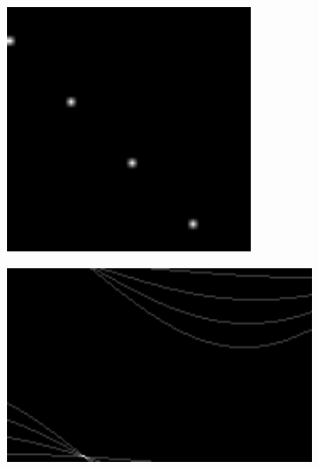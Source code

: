 \documentclass[12pt
,headinclude
,headsepline
,bibtotocnumbered
]{scrartcl}
\begin{document}
\begin{figure}[h]
    \centering
    \begin{subfigure}{0.45\textwidth}
        \includegraphics[width=0.8\textwidth]{plots/test1.png}
    \end{subfigure}
    \hfill
    \begin{subfigure}{0.45\textwidth}
        \includegraphics[width=1.25\textwidth]{plots/test1_hough.png}
    \end{subfigure}
    \\
    \begin{subfigure}{0.45\textwidth}

\end{subfigure}
\end{figure}
\end{document}
